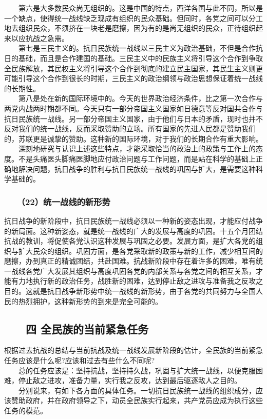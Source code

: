 \documentclass[cn,11pt,chinese]{elegantbook}
\def\myformat#1{\hfil\hfil #1}
\begin{document}
　　第六是大多数民众尚无组织的。这是中国的特点，西洋各国与此不同，所以是一个缺点，使得统一战线缺乏现成有组织的民众基础。但同时，各党之间可以分工地去组织民众，不须挤在一块老是磨擦，因为有的是尚无组织的民众，正待组织起来以应抗战之急需。\\
　　第七是三民主义的。抗日民族统一战线以三民主义为政治基础，不但是合作抗日的基础，而且是合作建国的基础。三民主义中的民族主义将引导这个合作到争取全民族解放，其民权主义将引导这个合作到彻底的建立民主国家，其民生主义则更可能引导这个合作到很长的时期，三民主义的政治纲领与政治思想保证着统一战线的长期性。\\
　　第八是处在新的国际环境中的。今天的世界政治经济条件，比之第一次合作与两党内战两时期都不同。今天只有一部分帝国主义国家如日德意等反对国共合作与抗日民族统一战线。另一部分帝国主义国家，由于他们与日本的矛盾，现时也并不反对我们的统一战线，反而采取赞助的立场。所有国家的先进人民都是赞助我们的，苏联更是诚挚的赞助。这种新的国际环境，对于我们的长期合作有重大影响。\\
　　深刻地研究与认识上述这些特点，才能采取恰当的政治上的政策与工作上的态度。不是头痛医头脚痛医脚地应付政治问题与工作问题，而是站在科学的基础上正确地解决问题，抗日战争的胜利与抗日民族统一战线的巩固与扩大，是需要这种科学基础的。\\
\subsubsection*{\myformat{　　（22）统一战线的新形势}}
抗日战争的新阶段中，抗日民族统一战线必须以一种新的姿态出现，才能应付战争的新局面。这种新姿态，就是统一战线的广大的发展与高度的巩固。十五个月团结抗战的教训，将促使各党认识这种发展与巩固之必要。发展方面，是扩大各党的组织与扩大民众的组织。巩固方面，是各党采取新的政策与新的工作，减少相互间的磨擦，办到真正的精诚团结，共赴国难。抗战新阶段中存在着许多的困难，唯有统一战线各党广大发展其组织与高度巩固各党的内部关系与各党之间的相互关系，才能有力地执行新的政治任务，战胜新的困难，达到停止敌之进攻与准备我之反攻之目的。这就是抗日战争新形势中统一战线的新形势，由于各党的共同努力与全国人民的热烈拥护，这种新形势的到来是完全可能的。\\
\subsection*{\myformat{　　四 全民族的当前紧急任务}}
根据过去抗战的总结与当前抗战及统一战线发展新阶段的估计，全民族的当前紧急任务应该是什么呢?应该和过去有些什么不同呢?\\
　　总的任务应该是：坚持抗战，坚持持久战，巩固与扩大统一战线，以便克服困难，停止敌之进攻，准备力量，实行我之反攻，达到最后驱逐敌人之目的。\\
　　分别说来，有如下各方面的具体任务。一切抗日民族统一战线的组织成分，应该赞助政府，并在政府领导之下，动员全民族实行起来，共产党员应成为执行这些任务的模范。\\
\end{document}
